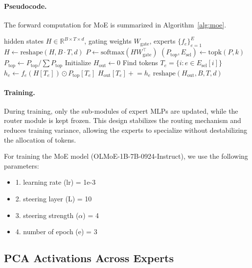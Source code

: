 \documentclass{article} %
\begin{document}
\paragraph{Pseudocode.}  
The forward computation for MoE is summarized in Algorithm~\ref{alg:moe}.

\begin{algorithm}[H]
\caption{Sparse Mixture-of-Experts Forward Pass}
\label{alg:moe}
\begin{algorithmic}[1]
\Require hidden states $H \in \mathbb{R}^{B \times T \times d}$, gating weights $W_\text{gate}$, experts $\{f_e\}_{e=1}^E$
\State $H \gets \text{reshape}(H, B \cdot T, d)$
\State $P \gets \text{softmax}(H W_\text{gate}^\top)$ 
\State $(P_\text{top}, E_\text{sel}) \gets \text{topk}(P, k)$ 
\State $P_\text{top} \gets P_\text{top} / \sum P_\text{top}$ 
\State Initialize $H_\text{out} \gets 0$
    \State Find tokens $T_e = \{i : e \in E_\text{sel}[i]\}$
    \State $h_e \gets f_e(H[T_e]) \odot P_\text{top}[T_e]$
    \State $H_\text{out}[T_e] \mathrel{+}= h_e$
\EndFor
\State \Return $\text{reshape}(H_\text{out}, B, T, d)$
\end{algorithmic}
\end{algorithm}

\paragraph{Training.}  
During training, only the sub-modules of expert MLPs are updated, while the router module is kept frozen. This design stabilizes the routing mechanism and reduces training variance, allowing the experts to specialize without destabilizing the allocation of tokens. 

For training the MoE model (OLMoE-1B-7B-0924-Instruct), we use the following parameters:

\begin{itemize}
\item 1. learning rate (lr) = 1e-3
\item 2. steering layer (L) = 10
\item 3. steering strength ($\alpha$) = 4
\item 4. number of epoch (e) = 3
\end{itemize}

\subsection{PCA Activations Across Experts}
\label{app:pca_experts}
\end{document}
